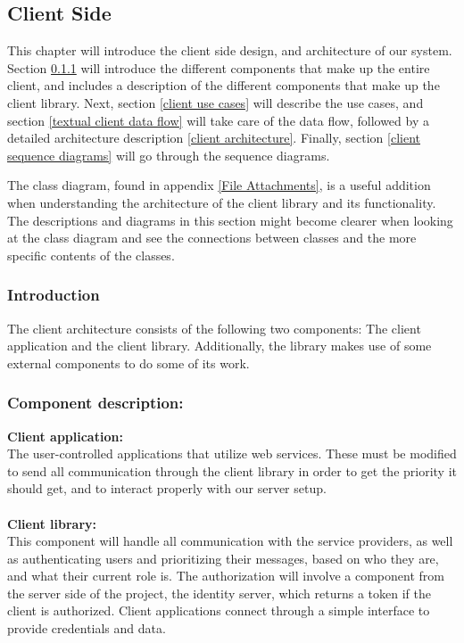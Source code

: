 \subsection{Client Side}\label{client side}

This chapter will introduce the client side design, and architecture of our system. Section \ref{client introduction} will introduce the different components that make up the entire client, and includes a description of the different components that make up the client library. Next, section \ref{client use cases} will describe the use cases, and section \ref{textual client data flow} will take care of the data flow, followed by a detailed architecture description \ref{client architecture}. Finally, section \ref{client sequence diagrams} will go through the sequence diagrams.
    
    The class diagram, found in appendix \ref{File Attachments}, is a useful addition when understanding the architecture of the client library and its functionality. The descriptions and diagrams in this section might become clearer when looking at the class diagram and see the connections between classes and the more specific contents of the classes. 
		
    \subsubsection{Introduction}\label{client introduction}
The client architecture consists of the following two components: The client application and the client library. Additionally, the library makes use of some external components to do some of its work.

    \subsubsection{Component description:}\label{Component description}

\indent \indent \textbf{Client application:}\\
	The user-controlled applications that utilize web services. These must be modified to send all communication through the client library in order to get the priority it should get, and to interact properly with our server setup.
\\\\

\indent \textbf{Client library:}\\
This component will handle all communication with the service providers, as well as authenticating users and prioritizing their messages, based on who they are, and what their current role is. The authorization will involve a component from the server side of the project, the identity server, which returns a token if the client is authorized. Client applications connect through a simple interface to provide credentials and data.
\\\\ 

